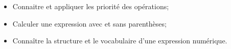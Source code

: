 \begin{myobj}
	\begin{itemize}
		\item Connaitre et appliquer les priorité des opérations;
		\item Calculer une expression avec et sans parenthèses;
		\item Connaître la structure et le vocabulaire d'une expression numérique.		
	\end{itemize}
\end{myobj}